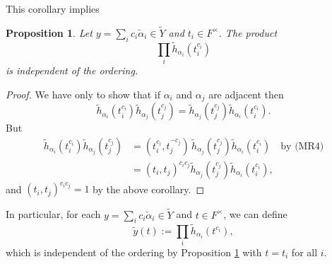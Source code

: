 \documentclass[10pt, letterpaper]{amsart}
\theoremstyle{plain}
\newtheorem{Prop}[equation]{Proposition}
\theoremstyle{definition}
\numberwithin{equation}{section}
\newcommand{\yt}{\tilde{y}}
\newcommand{\htt}{\tilde{h}}
\newcommand{\alphac}{{\check{\alpha}}}
\newcommand{\Yt}{\widetilde{Y}}
\begin{document}
This corollary implies
\begin{Prop}\label{ZTbiject}
Let $y=\sum_ic_i\alphac_i\in\Yt$ and $t_i\in F^\times$. The product
\[
\prod_{i}\htt_{\alpha_i}(t_i^{c_i})
\]
is independent of the ordering.
\end{Prop}
\begin{proof}
We have only to show that if $\alpha_i$ and $\alpha_j$ are adjacent then
\[
\htt_{\alpha_i}(t_i^{c_i})\htt_{\alpha_j}(t_j^{c_j})=\htt_{\alpha_j}(t_j^{c_j})\htt_{\alpha_i}(t_i^{c_i}).
\]
But
\begin{align*}
\htt_{\alpha_i}(t_i^{c_i})\htt_{\alpha_j}(t_j^{c_j})&=(t_i^{c_i}, t_j^{-c_j})\,\htt_{\alpha_j}(t_j^{c_j})\htt_{\alpha_i}(t_i^{c_i})\quad\text{by (MR4)}\\
&=(t_i, t_j)^{c_ic_j}\htt_{\alpha_j}(t_j^{c_j})\htt_{\alpha_i}(t_i^{c_i}),
\end{align*}
and $(t_i, t_j)^{c_ic_j}=1$ by the above corollary.
\end{proof}


In particular, for each $y=\sum_ic_i\alphac_i\in\Yt$ and $t\in F^\times$, we can define
\[
\yt(t):=\prod_{i}\htt_{\alpha_i}(t^{c_i}),
\]
which is independent of the ordering by Proposition \ref{ZTbiject} with $t=t_i$ for all $i$.
\end{document}
